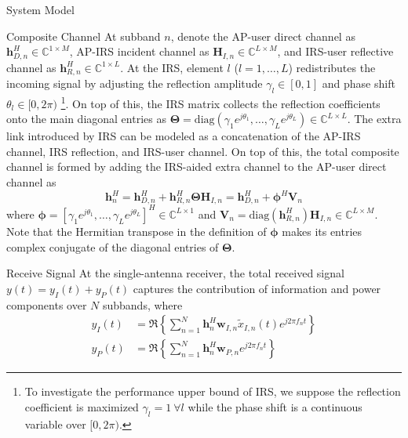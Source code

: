 \documentclass[journal]{IEEEtran}
\begin{document}
\begin{section}{System Model}
	\begin{subsection}{Composite Channel}
		At subband $n$, denote the AP-user direct channel as $\boldsymbol{h}_{D,n}^H \in \mathbb{C}^{1 \times M}$, AP-IRS incident channel as $\boldsymbol{H}_{I,n} \in \mathbb{C}^{L \times M}$, and IRS-user reflective channel as $\boldsymbol{h}_{R,n}^H \in \mathbb{C}^{1 \times L}$. At the IRS, element $l$ ($l=1,\dots,L$) redistributes the incoming signal by adjusting the reflection amplitude $\gamma_l \in [0,1]$ and phase shift $\theta_l \in [0,2\pi)$ \footnote{To investigate the performance upper bound of IRS, we suppose the reflection coefficient is maximized $\gamma_l=1 \ \forall l$ while the phase shift is a continuous variable over $[0,2\pi)$.}. On top of this, the IRS matrix collects the reflection coefficients onto the main diagonal entries as $\boldsymbol{\Theta} = \mathrm{diag}(\gamma_1 e^{j \theta_1}, \dots, \gamma_L e^{j \theta_L}) \in \mathbb{C}^{L \times L}$. The extra link introduced by IRS can be modeled as a concatenation of the AP-IRS channel, IRS reflection, and IRS-user channel. On top of this, the total composite channel is formed by adding the IRS-aided extra channel to the AP-user direct channel as
		\begin{equation}\label{eq:h_n}
			\boldsymbol{h}_{n}^H = \boldsymbol{h}_{D,n}^H + \boldsymbol{h}_{R,n}^H \boldsymbol{\Theta} \boldsymbol{H}_{I,n} = \boldsymbol{h}_{D,n}^H + \boldsymbol{\phi}^H \boldsymbol{V}_{n}
		\end{equation}
		where $\boldsymbol{\phi}=[\gamma_1 e^{j \theta_1}, \dots, \gamma_L e^{j \theta_L}]^H \in \mathbb{C}^{L \times 1}$ and $\boldsymbol{V}_{n}=\mathrm{diag}(\boldsymbol{h}_{R,n}^H)\boldsymbol{H}_{I,n} \in \mathbb{C}^{L \times M}$. Note that the Hermitian transpose in the definition of $\boldsymbol{\phi}$ makes its entries complex conjugate of the diagonal entries of $\boldsymbol{\Theta}$.
	\end{subsection}

	\begin{subsection}{Receive Signal}
		At the single-antenna receiver, the total received signal $y(t)=y_I(t)+y_P(t)$ captures the contribution of information and power components over $N$ subbands, where
		\begin{align}\label{eq:y_IP}
			y_{I}(t) & = \Re\left\{\sum_{n=1}^N{\boldsymbol{h}_{n}^H}{\boldsymbol{w}_{I,n}\tilde{x}_{I,n}(t)}{e^{j2{\pi}{f_n}{t}}}\right\}\\
			y_{P}(t) & = \Re\left\{\sum_{n=1}^N{\boldsymbol{h}_{n}^H}\boldsymbol{w}_{P,n}{e^{j2{\pi}{f_n}{t}}}\right\}
		\end{align}
	\end{subsection}


\end{section}
\end{document}
